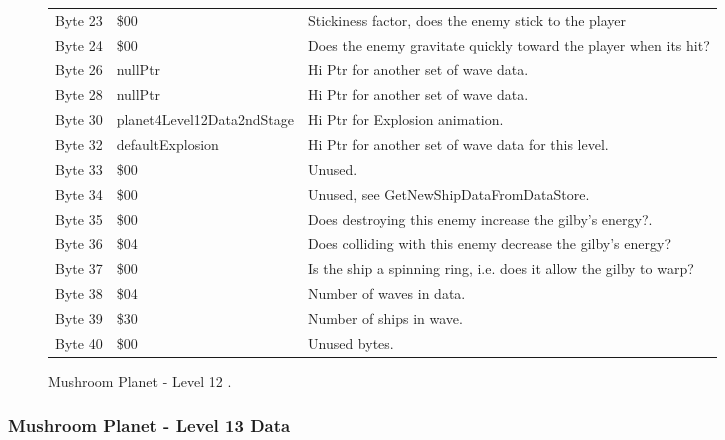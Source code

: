 \begin{figure}[H]
{\begin{adjustbox}{width=12cm}
\begin{tabular}{lll}
 Byte 23 & \$00                        & Stickiness factor, does the enemy stick to the player              \\
 Byte 24 & \$00                        & Does the enemy gravitate quickly toward the player when its hit?   \\
 Byte 26 & nullPtr                    & Hi Ptr for another set of wave data.                               \\
 Byte 28 & nullPtr                    & Hi Ptr for another set of wave data.                               \\
 Byte 30 & planet4Level12Data2ndStage & Hi Ptr for Explosion animation.                                    \\
 Byte 32 & defaultExplosion           & Hi Ptr for another set of wave data for this level.                \\
 Byte 33 & \$00                        & Unused.                                                            \\
 Byte 34 & \$00                        & Unused, see GetNewShipDataFromDataStore.                           \\
 Byte 35 & \$00                        & Does destroying this enemy increase the gilby's energy?.           \\
 Byte 36 & \$04                        & Does colliding with this enemy decrease the gilby's energy?        \\
 Byte 37 & \$00                        & Is the ship a spinning ring, i.e. does it allow the gilby to warp? \\
 Byte 38 & \$04                        & Number of waves in data.                                           \\
 Byte 39 & \$30                        & Number of ships in wave.                                           \\
 Byte 40 & \$00                        & Unused bytes.                                                      \\
\bottomrule
\end{tabular}

  \end{adjustbox}

  }\caption*{Mushroom Planet - Level 12
.}
\end{figure}

\clearpage
\subsubsection{Mushroom Planet - Level 13 Data}

